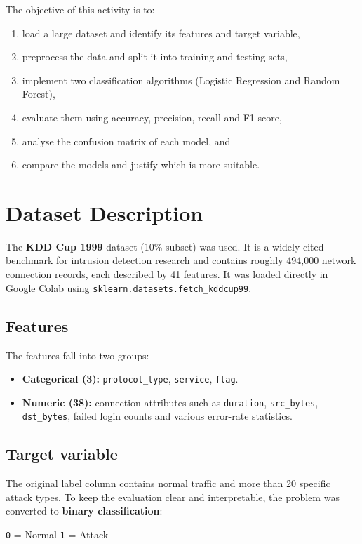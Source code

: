 \documentclass[12pt,a4paper]{article}
\begin{document}
The objective of this activity is to:
\begin{enumerate}
  \item load a large dataset and identify its features and target variable,
  \item preprocess the data and split it into training and testing sets,
  \item implement two classification algorithms (Logistic Regression and Random Forest),
  \item evaluate them using accuracy, precision, recall and F1-score,
  \item analyse the confusion matrix of each model, and
  \item compare the models and justify which is more suitable.
\end{enumerate}

\section{Dataset Description}
The \textbf{KDD Cup 1999} dataset (10\% subset) was used. It is a widely cited
benchmark for intrusion detection research and contains roughly 494{,}000
network connection records, each described by 41 features. It was loaded
directly in Google Colab using \texttt{sklearn.datasets.fetch\_kddcup99}.

\subsection{Features}
The features fall into two groups:
\begin{itemize}
  \item \textbf{Categorical (3):} \texttt{protocol\_type}, \texttt{service}, \texttt{flag}.
  \item \textbf{Numeric (38):} connection attributes such as \texttt{duration},
        \texttt{src\_bytes}, \texttt{dst\_bytes}, failed login counts and
        various error-rate statistics.
\end{itemize}

\subsection{Target variable}
The original label column contains normal traffic and more than 20 specific
attack types. To keep the evaluation clear and interpretable, the problem was
converted to \textbf{binary classification}:
\begin{center}
  \texttt{0} = Normal \qquad \texttt{1} = Attack
\end{center}
\end{document}
